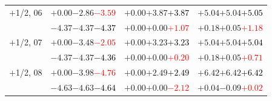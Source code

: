 \documentclass[compress]{beamer}
\begin{document}
\begin{frame}
\begin{tabular}{r | c | c | c}
$+$1/2, 06 & $+0.00$\hspace{0.1 cm}$-2.86$\hspace{0.1 cm}\textcolor{red}{$-3.59$} & $+0.00$\hspace{0.1 cm}$+3.87$\hspace{0.1 cm}\textcolor{black}{$+3.87$} & $+5.04$\hspace{0.1 cm}$+5.04$\hspace{0.1 cm}\textcolor{black}{$+5.05$} \\
           & $-4.37$\hspace{0.1 cm}$-4.37$\hspace{0.1 cm}\textcolor{black}{$-4.37$} & $+0.00$\hspace{0.1 cm}$+0.00$\hspace{0.1 cm}\textcolor{red}{$+1.07$} & $+0.18$\hspace{0.1 cm}$+0.05$\hspace{0.1 cm}\textcolor{red}{$+1.18$} \\
$+$1/2, 07 & $+0.00$\hspace{0.1 cm}$-3.48$\hspace{0.1 cm}\textcolor{red}{$-2.05$} & $+0.00$\hspace{0.1 cm}$+3.23$\hspace{0.1 cm}\textcolor{black}{$+3.23$} & $+5.04$\hspace{0.1 cm}$+5.04$\hspace{0.1 cm}\textcolor{black}{$+5.04$} \\
           & $-4.37$\hspace{0.1 cm}$-4.37$\hspace{0.1 cm}\textcolor{black}{$-4.36$} & $+0.00$\hspace{0.1 cm}$+0.00$\hspace{0.1 cm}\textcolor{red}{$+0.20$} & $+0.18$\hspace{0.1 cm}$+0.05$\hspace{0.1 cm}\textcolor{red}{$+0.71$} \\
$+$1/2, 08 & $+0.00$\hspace{0.1 cm}$-3.98$\hspace{0.1 cm}\textcolor{red}{$-4.76$} & $+0.00$\hspace{0.1 cm}$+2.49$\hspace{0.1 cm}\textcolor{black}{$+2.49$} & $+6.42$\hspace{0.1 cm}$+6.42$\hspace{0.1 cm}\textcolor{black}{$+6.42$} \\
           & $-4.63$\hspace{0.1 cm}$-4.63$\hspace{0.1 cm}\textcolor{black}{$-4.64$} & $+0.00$\hspace{0.1 cm}$+0.00$\hspace{0.1 cm}\textcolor{red}{$-2.12$} & $+0.04$\hspace{0.1 cm}$-0.09$\hspace{0.1 cm}\textcolor{red}{$+0.02$} \\

\end{tabular}
\end{frame}
\end{document}
